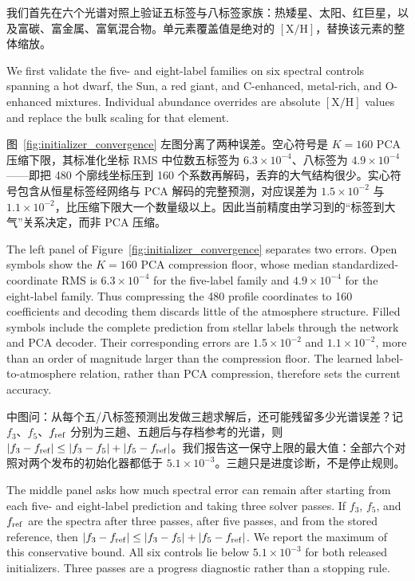 我们首先在六个光谱对照上验证五标签与八标签家族：热矮星、太阳、红巨星，以及富碳、富金属、富氧混合物。单元素覆盖值是绝对的 $[\mathrm{X}/\mathrm{H}]$，替换该元素的整体缩放。

\begin{EN}
We first validate the five- and eight-label families on six spectral controls spanning a hot
dwarf, the Sun, a red giant, and C-enhanced, metal-rich, and O-enhanced
mixtures. Individual abundance
overrides are absolute $[\mathrm{X}/\mathrm{H}]$ values and replace the bulk
scaling for that element.
\end{EN}

图~\ref{fig:initializer_convergence} 左图分离了两种误差。空心符号是 $K=160$ PCA 压缩下限，其标准化坐标 RMS 中位数五标签为 $6.3\times10^{-4}$、八标签为 $4.9\times10^{-4}$——即把 480 个廓线坐标压到 160 个系数再解码，丢弃的大气结构很少。实心符号包含从恒星标签经网络与 PCA 解码的完整预测，对应误差为 $1.5\times10^{-2}$ 与 $1.1\times10^{-2}$，比压缩下限大一个数量级以上。因此当前精度由学习到的“标签到大气”关系决定，而非 PCA 压缩。

\begin{EN}
The left panel of Figure~\ref{fig:initializer_convergence} separates two errors.
Open symbols show the $K=160$ PCA compression floor, whose median
standardized-coordinate RMS is $6.3\times10^{-4}$ for the five-label family and
$4.9\times10^{-4}$ for the eight-label family. Thus compressing the 480 profile
coordinates to 160 coefficients and decoding them discards little of the
atmosphere structure. Filled symbols include the complete prediction from
stellar labels through the network and PCA decoder. Their corresponding errors
are $1.5\times10^{-2}$ and $1.1\times10^{-2}$, more than an order of magnitude
larger than the compression floor. The learned label-to-atmosphere relation,
rather than PCA compression, therefore sets the current accuracy.
\end{EN}

中图问：从每个五/八标签预测出发做三趟求解后，还可能残留多少光谱误差？记 $f_3$、$f_5$、$f_{\rm ref}$ 分别为三趟、五趟后与存档参考的光谱，则 $|f_3-f_{\rm ref}|\leq |f_3-f_5|+|f_5-f_{\rm ref}|$。我们报告这一保守上限的最大值：全部六个对照对两个发布的初始化器都低于 $5.1\times10^{-3}$。三趟只是进度诊断，不是停止规则。

\begin{EN}
The middle panel asks how much spectral error can remain after starting from
each five- and eight-label prediction and taking three solver passes. If
$f_3$, $f_5$, and $f_{\rm ref}$ are the spectra after three passes, after five
passes, and from the stored reference, then
$|f_3-f_{\rm ref}|\leq |f_3-f_5|+|f_5-f_{\rm ref}|$. We report the maximum of
this conservative bound. All six controls lie below $5.1\times10^{-3}$ for
both released initializers. Three passes are a progress diagnostic rather than
a stopping rule.
\end{EN}

